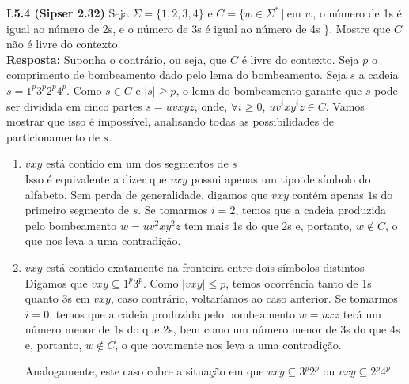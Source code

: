 
\noindent \textbf{L5.4 (Sipser 2.32)} Seja $\Sigma = \{1, 2, 3, 4\}$ e $C = \{w \in \Sigma^* \ |\ $em $w$, o número de 1s é igual ao número de 2s, e o número de 3s é igual ao número de 4s $\}$. Mostre que $C$ não é livre do contexto.\\[3pt]
\textbf{Resposta: } Suponha o contrário, ou seja, que $C$ é livre do contexto. Seja $p$ o comprimento de bombeamento dado pelo lema do bombeamento. Seja $s$ a cadeia $s = 1^p3^p2^p4^p$. Como $s \in C$ e $|s| \geq p$, o lema do bombeamento garante que $s$ pode ser dividida em cinco partes $s = uvxyz$, onde, $\forall i \geq 0$, $uv^ixy^iz \in C$. Vamos mostrar que isso é impossível, analisando todas as possibilidades de particionamento de $s$.

\begin{enumerate}[label={\textbf{Caso \arabic*:}}]
    \item $vxy$ está contido em um dos segmentos de $s$\\[2pt]
    Isso é equivalente a dizer que $vxy$ possui apenas um tipo de símbolo do alfabeto. Sem perda de generalidade, digamos que $vxy$ contém apenas $1$s do primeiro segmento de $s$. Se tomarmos $i = 2$, temos que a cadeia produzida pelo bombeamento $w = uv^2xy^2z$ tem mais 1s do que 2s e, portanto, $w \notin C$, o que nos leva a uma contradição.
    
    \item $vxy$ está contido exatamente na fronteira entre dois símbolos distintos\\[2pt]
    Digamos que $vxy \subseteq 1^p3^p$. Como $|vxy| \leq p$, temos ocorrência tanto de 1s quanto 3s em $vxy$, caso contrário, voltaríamos ao caso anterior. Se tomarmos $i = 0$, temos que a cadeia produzida pelo bombeamento $w = uxz$ terá um número menor de 1s do que 2s, bem como um número menor de 3s do que 4s e, portanto, $w \notin C$, o que novamente nos leva a uma contradição.
    
    Analogamente, este caso cobre a situação em que $vxy \subseteq 3^p2^p$ ou $vxy \subseteq 2^p4^p$.
\end{enumerate}
